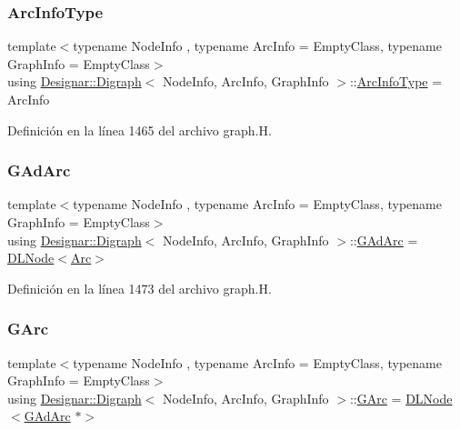 \subsubsection{\texorpdfstring{Arc\+Info\+Type}{ArcInfoType}}
{\footnotesize\ttfamily template$<$typename Node\+Info , typename Arc\+Info  = Empty\+Class, typename Graph\+Info  = Empty\+Class$>$ \\
using \hyperlink{class_designar_1_1_digraph}{Designar\+::\+Digraph}$<$ Node\+Info, Arc\+Info, Graph\+Info $>$\+::\hyperlink{class_designar_1_1_digraph_a84a736f6c32da0fcbd1d047e74264d00}{Arc\+Info\+Type} =  Arc\+Info}



Definición en la línea 1465 del archivo graph.\+H.

\mbox{\label{class_designar_1_1_digraph_a0c6d846f23d1e82556fb6055557df53f}} 
\subsubsection{\texorpdfstring{G\+Ad\+Arc}{GAdArc}}
{\footnotesize\ttfamily template$<$typename Node\+Info , typename Arc\+Info  = Empty\+Class, typename Graph\+Info  = Empty\+Class$>$ \\
using \hyperlink{class_designar_1_1_digraph}{Designar\+::\+Digraph}$<$ Node\+Info, Arc\+Info, Graph\+Info $>$\+::\hyperlink{class_designar_1_1_digraph_a0c6d846f23d1e82556fb6055557df53f}{G\+Ad\+Arc} =  \hyperlink{class_designar_1_1_d_l_node}{D\+L\+Node}$<$\hyperlink{class_designar_1_1_digraph_a0ceb278671f2a535c00fddccdeafd69f}{Arc}$>$\hspace{0.3cm}{\ttfamily [protected]}}



Definición en la línea 1473 del archivo graph.\+H.

\mbox{\label{class_designar_1_1_digraph_a341acf8fb0195a8986158c29c4db1a89}} 
\subsubsection{\texorpdfstring{G\+Arc}{GArc}}
{\footnotesize\ttfamily template$<$typename Node\+Info , typename Arc\+Info  = Empty\+Class, typename Graph\+Info  = Empty\+Class$>$ \\
using \hyperlink{class_designar_1_1_digraph}{Designar\+::\+Digraph}$<$ Node\+Info, Arc\+Info, Graph\+Info $>$\+::\hyperlink{class_designar_1_1_digraph_a341acf8fb0195a8986158c29c4db1a89}{G\+Arc} =  \hyperlink{class_designar_1_1_d_l_node}{D\+L\+Node}$<$\hyperlink{class_designar_1_1_digraph_a0c6d846f23d1e82556fb6055557df53f}{G\+Ad\+Arc} $\ast$$>$\hspace{0.3cm}{\ttfamily [protected]}}



